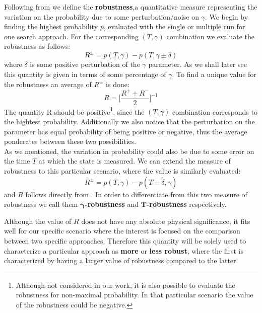         Following from \cite{SH.HungS.Hietala2019} we define the \textbf{robustness},a quantitative measure representing the variation on the probability due to some perturbation/noise on $\gamma$.
        We begin by finding the highest probability $p$, evaluated with the single or multiple run for one search approach. For the corresponding $(T,\gamma)$ combination we evaluate the robustness as follows:
        \begin{equation}
            R ^\pm = p(T, \gamma) - p(T, \gamma \pm \delta)
        \end{equation}
        where $\delta$ is some positive perturbation of the $\gamma$ parameter. As we shall later see this quantity is given in terms of some percentage of $\gamma$. To find a unique value for the robustness an average of $R^\pm$ is done:
        \begin{equation}
            R = \bigg[\frac{R^++ R^-}{2}\bigg]^{-1}
            \label{eq:robustness}
        \end{equation}
        The quantity R should be positive\footnote{ Although not considered in our work, it is also possible to evaluate the robustness for non-maximal probability. In that particular scenario the value of the robustness could be negative.}, since the $(T,\gamma)$ combination corresponds to the hightest probability. Additionally we also notice that the perturbation on the parameter has equal probability of being positive or negative, thus the average ponderates between these two possibilities. \\

        \noindent
        As we mentioned, the variation in probability could also be due to some error on the time $T$ at which the state is measured. We can extend the measure of robustness to this particular scenario, where the value is similarly evaluated:
        \begin{equation}
            R ^\pm = p(T, \gamma) - p(T \pm \tilde{\delta}, \gamma )
        \end{equation}
        and $R$ follows directly from .
        In order to differentiate from this two measure of robustness we call them \textbf{$\bm{\gamma}$-robustness} and \textbf{$\bm{T}$-robustness} respectively.


        Although the value of $R$ does not have any absolute physical significance, it fits well for our specific scenario where the interest is focused on the comparison between two specific approaches. Therefore this quantity will be solely used to characterize a particular approach as \textbf{more} or \textbf{less robust}, where the first is characterized by having a larger value of robustness compared to the latter.

